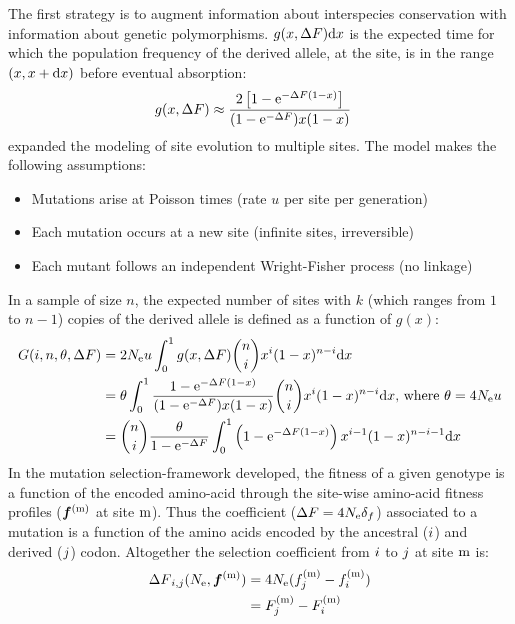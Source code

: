 The first strategy is to augment information about interspecies conservation with information about genetic polymorphisms.
$g(x, {\Delta F}) \mathrm{d} x $ is the expected time for which the population frequency of the derived allele, at the site, is in the range $(x, x+\mathrm{d} x)$ before eventual absorption:
\begin{align}
	g(x, {\Delta F}) & \approx \dfrac{2 \left[ 1 - \mathrm{e}^{-{\Delta F} (1-x)}\right]}{(1 - \mathrm{e}^{-{\Delta F}})x(1-x)}
\end{align}
\citet{Sawyer1992} expanded the modeling of site evolution to multiple sites.
The model makes the following assumptions:
\begin{itemize}
	\setlength\itemsep{-0.2em}
	\item Mutations arise at Poisson times (rate $u$ per site per generation)
	\item Each mutation occurs at a new site (infinite sites, irreversible)
	\item Each mutant follows an independent Wright-Fisher process (no linkage)
\end{itemize}
In a sample of size $n$, the expected number of sites with $k$ (which ranges from $1$ to $n-1$) copies of the derived allele is defined as a function of $g(x)$:
\begin{align}
	G(i, n, \theta, {\Delta F}) & = 2 N_{\textrm{e}} u \int_{0}^{1} g(x, {\Delta F}) \binom{n}{i} x^{i} (1-x)^{n-i} \mathrm{d} x \nonumber \\
	& = \theta \int_{0}^{1} \dfrac{1 - \mathrm{e}^{-{\Delta F} (1-x)}}{(1 - \mathrm{e}^{-{\Delta F}})x(1-x)} \binom{n}{i} x^{i} (1-x)^{n-i} \mathrm{d} x\text{, where } \theta=4N_{\textrm{e}} u \nonumber \\
	& = \binom{n}{i} \dfrac{\theta }{1 - \mathrm{e}^{-{\Delta F}}} \int_{0}^{1} \left( 1 - \mathrm{e}^{-{\Delta F} (1-x)} \right) x^{i-1} (1-x)^{n-i-1} \mathrm{d} x
\end{align}
In the mutation selection-framework developed, the fitness of a given genotype is a function of the encoded amino-acid through the site-wise amino-acid fitness profiles ($ \bm{f}^{(\text{m})} $ at site $\text{m}$). Thus the coefficient (${\Delta F}=4N_{\textrm{e}} {\delta_{f}} $) associated to a mutation is a function of the amino acids encoded by the ancestral (${i}$) and derived (${j}$) codon. Altogether the selection coefficient from ${i}$ to ${j}$ at site $\text{m}$ is:
\begin{align}
	{\Delta F}_{{i}, {j}}(N_{\textrm{e}}, \bm{f}^{(\text{m})}) &= 4 N_{\textrm{e}} (f_{j}^{(\text{m})}-f_{i}^{(\text{m})}) \nonumber \\
	& = F_{j}^{(\text{m})}-F_{i}^{(\text{m})}
\end{align}
